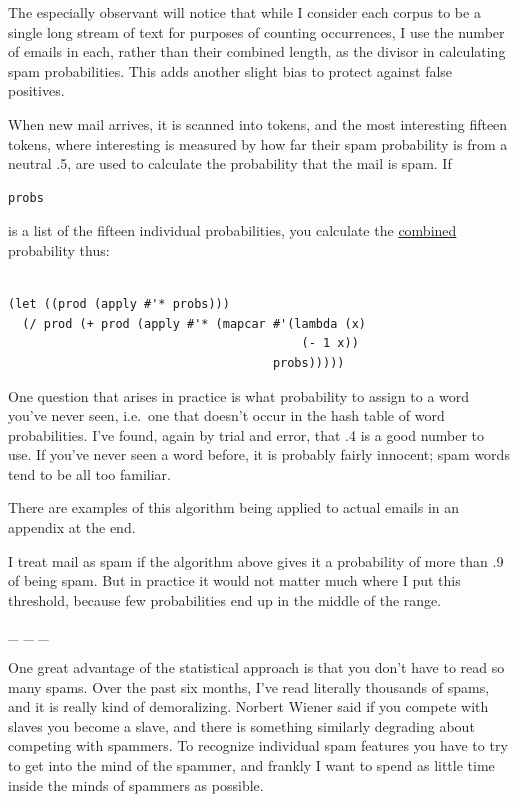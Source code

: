 The especially observant will notice that while I consider each corpus
to be a single long stream of text for purposes of counting occurrences,
I use the number of emails in each, rather than their combined length,
as the divisor in calculating spam probabilities. This adds another
slight bias to protect against false positives.

When new mail arrives, it is scanned into tokens, and the most
interesting fifteen tokens, where interesting is measured by how far
their spam probability is from a neutral .5, are used to calculate the
probability that the mail is spam. If

\begin{verbatim}
probs
\end{verbatim}

is a list of the fifteen individual probabilities, you calculate the
\href{naivebayes.html}{combined} probability thus:

\begin{verbatim}

(let ((prod (apply #'* probs)))
  (/ prod (+ prod (apply #'* (mapcar #'(lambda (x) 
                                         (- 1 x))
                                     probs)))))
\end{verbatim}

One question that arises in practice is what probability to assign to a
word you've never seen, i.e.~one that doesn't occur in the hash table of
word probabilities. I've found, again by trial and error, that .4 is a
good number to use. If you've never seen a word before, it is probably
fairly innocent; spam words tend to be all too familiar.

There are examples of this algorithm being applied to actual emails in
an appendix at the end.

I treat mail as spam if the algorithm above gives it a probability of
more than .9 of being spam. But in practice it would not matter much
where I put this threshold, because few probabilities end up in the
middle of the range.

\_ \_ \_

One great advantage of the statistical approach is that you don't have
to read so many spams. Over the past six months, I've read literally
thousands of spams, and it is really kind of demoralizing. Norbert
Wiener said if you compete with slaves you become a slave, and there is
something similarly degrading about competing with spammers. To
recognize individual spam features you have to try to get into the mind
of the spammer, and frankly I want to spend as little time inside the
minds of spammers as possible.

